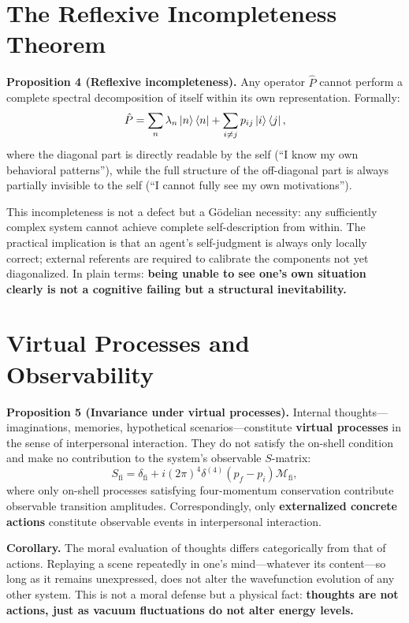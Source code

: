 ﻿\documentclass[11pt,a4paper]{article}
\begin{document}

\section{The Reflexive Incompleteness Theorem}

\textbf{Proposition 4 (Reflexive incompleteness).} Any operator $\hat{P}$ cannot perform a complete spectral decomposition of itself within its own representation. Formally:
\begin{equation}
\hat{P} = \sum_{n} \lambda_n \ket{n}\bra{n} + \sum_{i\neq j} p_{ij} \ket{i}\bra{j},
\end{equation}
where the diagonal part is directly readable by the self (``I know my own behavioral patterns''), while the full structure of the off-diagonal part is always partially invisible to the self (``I cannot fully see my own motivations'').

This incompleteness is not a defect but a G\"{o}delian necessity: any sufficiently complex system cannot achieve complete self-description from within. The practical implication is that an agent's self-judgment is always only locally correct; external referents are required to calibrate the components not yet diagonalized. In plain terms: \textbf{being unable to see one's own situation clearly is not a cognitive failing but a structural inevitability.}

\section{Virtual Processes and Observability}

\textbf{Proposition 5 (Invariance under virtual processes).} Internal thoughts---imaginations, memories, hypothetical scenarios---constitute \textbf{virtual processes} in the sense of interpersonal interaction. They do not satisfy the on-shell condition and make no contribution to the system's observable $S$-matrix:
\begin{equation}
S_{\mathrm{fi}} = \delta_{\mathrm{fi}} + i(2\pi)^4 \delta^{(4)}(p_f - p_i) \mathcal{M}_{\mathrm{fi}},
\end{equation}
where only on-shell processes satisfying four-momentum conservation contribute observable transition amplitudes. Correspondingly, only \textbf{externalized concrete actions} constitute observable events in interpersonal interaction.

\textbf{Corollary.} The moral evaluation of thoughts differs categorically from that of actions. Replaying a scene repeatedly in one's mind---whatever its content---so long as it remains unexpressed, does not alter the wavefunction evolution of any other system. This is not a moral defense but a physical fact: \textbf{thoughts are not actions, just as vacuum fluctuations do not alter energy levels.}
\end{document}
